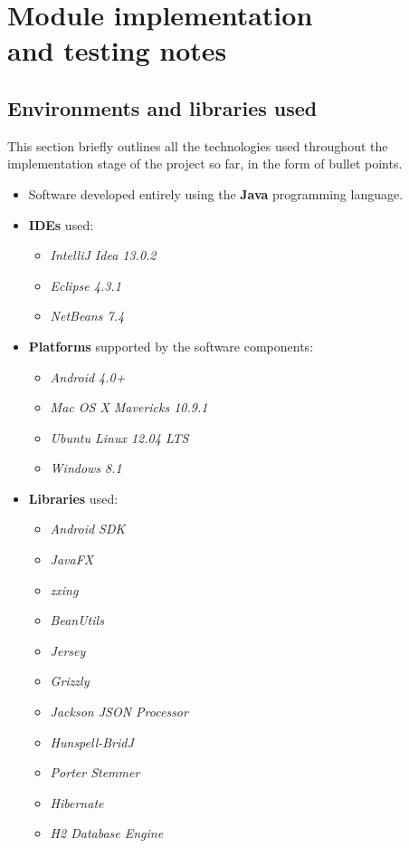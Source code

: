 \documentclass[12p, a4paper, onecolumn]{report}
\begin{document}
\chapter[Module implementation and testing notes]{Module implementation \\ and testing notes}

\section{Environments and libraries used}

This section briefly outlines all the technologies used throughout the implementation stage of the project so far, in the form of bullet points.
\begin{itemize}
\item Software developed entirely using the \textbf{Java} programming language.
\item \textbf{IDEs} used:
\begin{itemize}
\item \emph{IntelliJ Idea 13.0.2}
\item \emph{Eclipse 4.3.1}
\item \emph{NetBeans 7.4}
\end{itemize}
\item \textbf{Platforms} supported by the software components:
\begin{itemize}
\item \emph{Android 4.0+}
\item \emph{Mac OS X Mavericks 10.9.1}
\item \emph{Ubuntu Linux 12.04 LTS}
\item \emph{Windows 8.1}
\end{itemize}
\item \textbf{Libraries} used:
\begin{itemize}
\item \emph{Android SDK}
\item \emph{JavaFX}
\item \emph{zxing}
\item \emph{BeanUtils}
\item \emph{Jersey}
\item \emph{Grizzly}
\item \emph{Jackson JSON Processor}
\item \emph{Hunspell-BridJ}
\item \emph{Porter Stemmer}
\item \emph{Hibernate}
\item \emph{H2 Database Engine}

\end{itemize}
\end{itemize}
\end{document}
